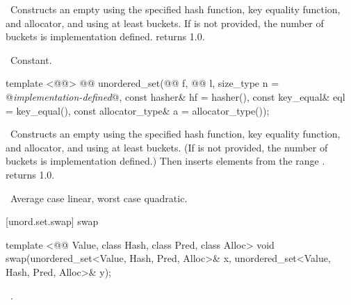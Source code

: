 \documentclass[american,twoside]{book}
\begin{document}
\begin{itemdescr}
\pnum
\effects\ Constructs an empty  using the
specified hash function, key equality function, and allocator, and
using at least \textit{} buckets.  If \textit{} is not
provided, the number of buckets is implementation
defined.   returns 1.0.

\pnum
\complexity\ Constant.
\end{itemdescr}

%
\begin{itemdecl}
template <@@>
  @@
  unordered_set(@@ f, @@ l,
                size_type n = @\textit{implementation-defined}@,
                const hasher& hf = hasher(),
                const key_equal& eql = key_equal(),
                const allocator_type& a = allocator_type());
\end{itemdecl}

\begin{itemdescr}
\pnum
\effects\ Constructs an empty  using the
specified hash function, key equality function, and allocator, and
using at least \textit{} buckets.  (If \textit{} is not
provided, the number of buckets is implementation defined.)  Then
inserts elements from the range \tcode{[\textit{f}, \textit{l})}.
 returns 1.0.

\pnum
\complexity\ Average case linear, worst case quadratic.
\end{itemdescr}

[unord.set.swap]{ swap}

%
%
\begin{itemdecl}
template <@@ Value, class Hash, class Pred, class Alloc>
  void swap(unordered_set<Value, Hash, Pred, Alloc>& x,
            unordered_set<Value, Hash, Pred, Alloc>& y);
\end{itemdecl}

\begin{itemdescr}
\pnum\effects\ .
\end{itemdescr}
\end{document}
